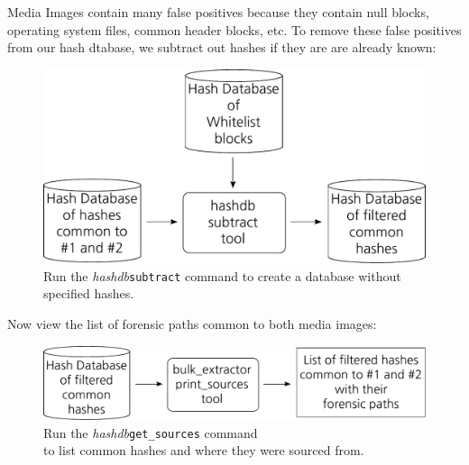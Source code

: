 \documentclass[12pt,twoside]{article}
\newcommand{\hdb}{\emph{hashdb}\xspace}
\begin{document}
Media Images contain many false positives because they contain
null blocks, operating system files, common header blocks, etc.
To remove these false positives from our hash dtabase,
we subtract out hashes if they are are already known:

\begin{figure}[H]
  \center
  \includegraphics[scale=0.6]{drawings/subtract_whitelist}
  \caption*{Run the \hdb \texttt{subtract} command to create a database without specified hashes.}
\end{figure}

Now view the list of forensic paths common to both media images:

\begin{figure}[H]
  \center
  \includegraphics[scale=0.6]{drawings/print_sources}
  \caption*{Run the \hdb \texttt{get\_sources} command \\
            to list common hashes and where they were sourced from.}
\end{figure}
\end{document}
